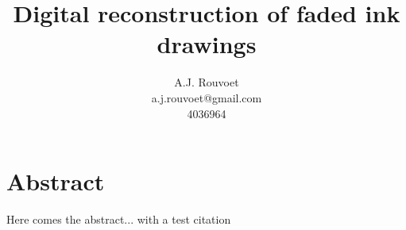 \documentclass[a4paper]{article}
\author{A.J. Rouvoet\\ a.j.rouvoet@gmail.com \\ 4036964}
\title{Digital reconstruction of faded ink drawings}
\begin{document}
	\maketitle

	\section*{Abstract}
		
		Here comes the abstract... with a test citation \cite{levin2004colorization}

	\tableofcontents

	

	
	
\end{document}
